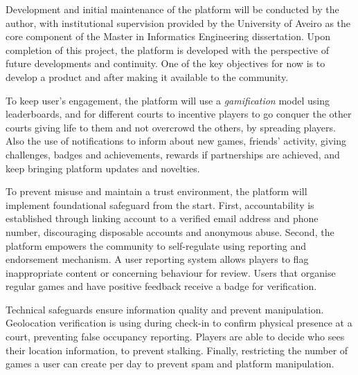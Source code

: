 Development and initial maintenance of the platform will be conducted by the author, with institutional supervision provided by the University of Aveiro as the core component of the Master in Informatics Engineering dissertation. Upon completion of this project, the platform is developed with the perspective of future developments and continuity. 
One of the key objectives for now is to develop a product and after making it available to the community. 


To keep user's engagement, the platform will use a \textit{gamification} model using leaderboards, and for different courts to incentive players to go conquer the other courts giving life to them and not overcrowd the others, by spreading players. Also the use of notifications to inform about new games, friends' activity, giving challenges, badges and achievements,  rewards if partnerships are achieved, and keep bringing platform updates and novelties.

To prevent misuse and maintain a trust environment, the platform will implement foundational safeguard from the start.
First, accountability is established through linking account to a verified email address and phone number, discouraging disposable accounts and anonymous abuse.
Second, the platform empowers the community to self-regulate using reporting and endorsement mechanism.
A user reporting system allows players to flag inappropriate content or concerning behaviour for review.
Users that organise regular games and have positive feedback receive a badge for verification.

Technical safeguards ensure information quality and prevent manipulation. 
Geolocation verification is using during check-in to confirm physical presence at a court, preventing false occupancy reporting.
Players are able to decide who sees their location information, to prevent stalking.
Finally, restricting the number of games a user can create per day to prevent spam and platform manipulation.

